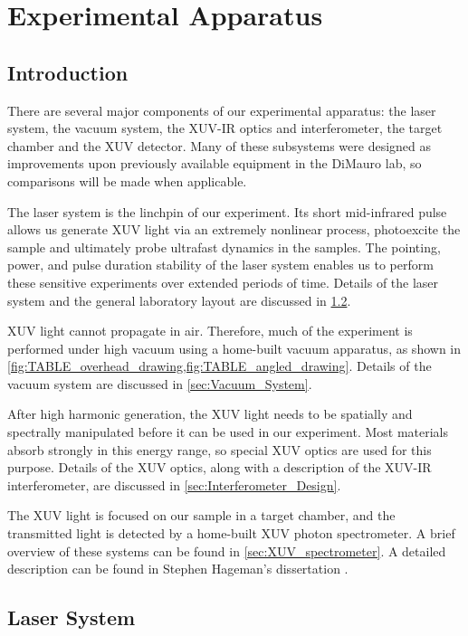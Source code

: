 \chapter{Experimental Apparatus}

\section{Introduction}

There are several major components of our experimental apparatus: the laser system, the vacuum system, the XUV-IR optics and interferometer, the target chamber and the XUV detector. Many of these subsystems were designed as improvements upon previously available equipment in the DiMauro lab, so comparisons will be made when applicable.

The laser system is the linchpin of our experiment. Its short mid-infrared pulse allows us generate XUV light via an extremely nonlinear process, photoexcite the sample and ultimately probe ultrafast dynamics in the samples. The pointing, power, and pulse duration stability of the laser system enables us to perform these sensitive experiments over extended periods of time. Details of the laser system and the general laboratory layout are discussed in \cref{sec:Laser_System}.

XUV light cannot propagate in air. Therefore, much of the experiment is performed under high vacuum using a home-built vacuum apparatus, as shown in \cref{fig:TABLE_overhead_drawing,fig:TABLE_angled_drawing}. Details of the vacuum system are discussed in \cref{sec:Vacuum_System}.

After high harmonic generation, the XUV light needs to be spatially and spectrally manipulated before it can be used in our experiment. Most materials absorb strongly in this energy range, so special XUV optics are used for this purpose. Details of the XUV optics, along with a description of the XUV-IR interferometer, are discussed in \cref{sec:Interferometer_Design}. 

The XUV light is focused on our sample in a target chamber, and the transmitted light is detected by a home-built XUV photon spectrometer. A brief overview of these systems can be found in \cref{sec:XUV_spectrometer}. A detailed description can be found in Stephen Hageman's dissertation \cite{hagemanComplexAttosecondTransientAbsorption2020}.


\section{Laser System}
\label{sec:Laser_System}

